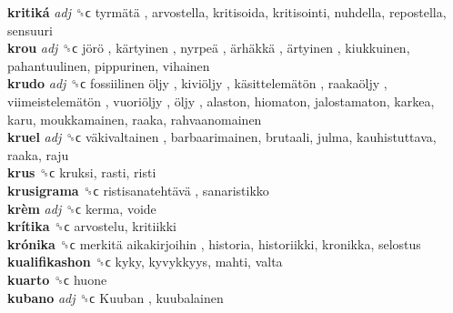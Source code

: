 \textbf{kritiká} \emph{adj}  ␝ϲ   tyrmätä , arvostella, kritisoida, kritisointi, nuhdella, repostella, sensuuri  \\
\textbf{krou} \emph{adj}  ␝ϲ   jörö ,  kärtyinen ,  nyrpeä ,  ärhäkkä ,  ärtyinen , kiukkuinen, pahantuulinen, pippurinen, vihainen  \\
\textbf{krudo} \emph{adj}  ␝ϲ   fossiilinen öljy ,  kiviöljy ,  käsittelemätön ,  raakaöljy ,  viimeistelemätön ,  vuoriöljy ,  öljy , alaston, hiomaton, jalostamaton, karkea, karu, moukkamainen, raaka, rahvaanomainen  \\
\textbf{kruel} \emph{adj}  ␝ϲ   väkivaltainen , barbaarimainen, brutaali, julma, kauhistuttava, raaka, raju  \\
\textbf{krus} ␝ϲ  kruksi, rasti, risti  \\
\textbf{krusigrama} ␝ϲ   ristisanatehtävä , sanaristikko  \\
\textbf{krèm} \emph{adj}  ␝ϲ  kerma, voide  \\
\textbf{krítika} ␝ϲ  arvostelu, kritiikki  \\
\textbf{krónika} ␝ϲ   merkitä aikakirjoihin , historia, historiikki, kronikka, selostus  \\
\textbf{kualifikashon} ␝ϲ  kyky, kyvykkyys, mahti, valta  \\
\textbf{kuarto} ␝ϲ  huone  \\
\textbf{kubano} \emph{adj}  ␝ϲ   Kuuban , kuubalainen  \\
